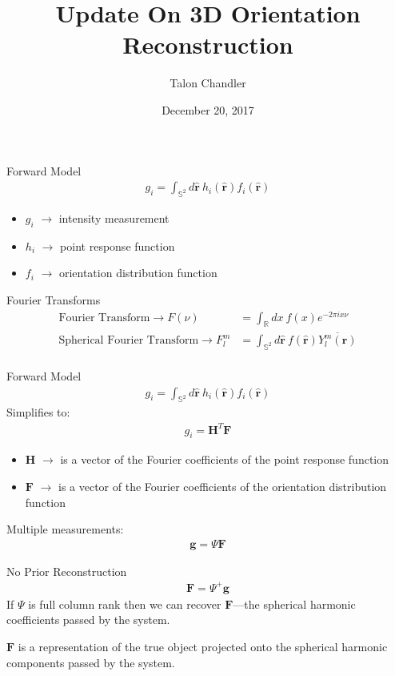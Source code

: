 \documentclass[presentation]{beamer}
\author{Talon Chandler}
\date{December 20, 2017}
\title{Update On 3D Orientation Reconstruction}
\begin{document}
\maketitle
\begin{frame}[label=sec-1]{Forward Model}
\begin{align*}
g_i = \int_{\mathbb{S}^2}d\hat{\textbf{r}}\ h_i(\hat{\textbf{r}})f_i(\hat{\textbf{r}})
\end{align*}
\begin{itemize}
\item $g_i$ $\rightarrow$ intensity measurement
\item $h_i$ $\rightarrow$ point response function
\item $f_i$ $\rightarrow$ orientation distribution function
\end{itemize}
\end{frame}
\begin{frame}[label=sec-2]{Fourier Transforms}
\begin{align*}
\text{Fourier Transform} \rightarrow F(\nu) &= \int_{\mathbb{R}}dx\ f(x)e^{-2\pi i x\nu}\\
\text{Spherical Fourier Transform} \rightarrow F_l^m &= \int_{\mathbb{S}^2}d\hat{\textbf{r}}\ f(\hat{\textbf{r}})\overline{Y_l^m(\hat{\textbf{r}})}\\
\end{align*}
\end{frame}
\begin{frame}[label=sec-3]{Forward Model}
\begin{align*}
g_i = \int_{\mathbb{S}^2}d\hat{\textbf{r}}\ h_i(\hat{\textbf{r}})f_i(\hat{\textbf{r}})
\end{align*}
Simplifies to:
\begin{align*}
g_i = \textbf{H}^T\textbf{F}
\end{align*}
\begin{itemize}
\item $\textbf{H}$ $\rightarrow$ is a vector of the Fourier coefficients of the point response function
\item $\textbf{F}$ $\rightarrow$ is a vector of the Fourier coefficients of the orientation distribution function
\end{itemize}
Multiple measurements:
\begin{align*}
\textbf{g} = \Psi\textbf{F}
\end{align*}
\end{frame}
\begin{frame}[label=sec-4]{No Prior Reconstruction}
\begin{align*}
\textbf{F} = \Psi^+\textbf{g}
\end{align*}
If $\Psi$ is full column rank then we can recover $\textbf{F}$---the spherical
harmonic coefficients passed by the system.\vspace{2em}

$\textbf{F}$ is a representation of the true object projected onto the spherical 
harmonic components passed by the system.
\end{frame}
\end{document}
